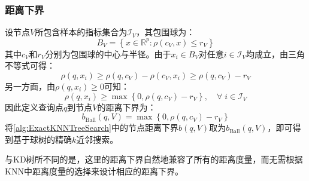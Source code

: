 \subsubsection{距离下界}
设节点$V$所包含样本的指标集合为$\mathcal{I}_V$，其包围球为：
\begin{equation*}
	B_V=\left\{x\in\mathbb{R}^{p}:\rho(c_V,x)\leqslant r_V\right\}
\end{equation*}
其中$c_V$和$r_V$分别为包围球的中心与半径。由于$x_i\in B_V$对任意$i\in\mathcal{I}_V$均成立，由三角不等式可得：
\begin{equation*}
	\rho(q,x_i)\geqslant\rho(q,c_V)-\rho(c_V,x_i)\geqslant\rho(q,c_V)-r_V
\end{equation*}
另一方面，由$\rho(q,x_i)\geqslant0$可知：
\begin{equation*}
	\rho(q,x_i)\geqslant\max\left\{0,\rho(q,c_V)-r_V\right\},\quad\forall\;i\in\mathcal{I}_V
\end{equation*}
因此定义查询点$q$到节点$V$的距离下界为：
\begin{equation*}
	b_{\mathrm{Ball}}(q,V)=\max\left\{0,\rho(q,c_V)-r_V\right\}
\end{equation*}
将\cref{alg:ExactKNNTreeSearch}中的节点距离下界$b(q,V)$取为$b_{\mathrm{Ball}}(q,V)$，即可得到基于球树的精确$k$近邻搜索。\par
与KD树所不同的是，这里的距离下界自然地兼容了所有的距离度量，而无需根据KNN中距离度量的选择来设计相应的距离下界。